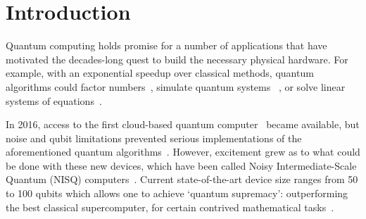 \documentclass[prx,twocolumn,floatfix,superscriptaddress,longbibliography]{revtex4-1}
\newcommand{\<}{\langle}
\renewcommand{\>}{\rangle}
\begin{document}
\begin{abstract}
Applications such as simulating complicated quantum systems or solving large-scale linear algebra problems are very challenging for classical computers due to the extremely high computational cost. Quantum computers promise a solution, although fault-tolerant quantum computers will likely not be available in the near future. Current quantum devices have serious constraints, including limited numbers of qubits  and noise processes that limit circuit depth. Variational Quantum Algorithms (VQAs), which use a classical optimizer to train a parametrized quantum circuit, have emerged as a leading strategy to address these constraints. VQAs have now been proposed for essentially all applications that researchers have envisioned for quantum computers, and they appear to the best hope for obtaining quantum advantage. Nevertheless, challenges remain including the trainability, accuracy, and efficiency of VQAs. Here we overview the field of VQAs, discuss strategies to overcome their challenges, and highlight the exciting prospects for using them to obtain quantum advantage.
\end{abstract}




\maketitle


\section{Introduction}
Quantum computing holds promise for a number of applications that have motivated the decades-long quest to build the necessary physical hardware. For example, with an exponential speedup over classical methods, quantum algorithms could factor numbers~\cite{shor1994algorithms}, simulate quantum systems ~\cite{lloyd1996universal}, or solve linear systems of equations~\cite{harrow2009quantum}. 

In 2016, access to the first cloud-based quantum computer~\cite{IBM} became available, but noise and qubit limitations prevented serious implementations of the aforementioned quantum algorithms~\cite{coles2018quantum}. However, excitement grew as to what could be done with these new devices, which have been called Noisy Intermediate-Scale Quantum (NISQ) computers~\cite{preskill2018quantum}. Current state-of-the-art device size ranges from 50 to 100 qubits which allows one to achieve `quantum supremacy': outperforming the best classical supercomputer, for certain contrived mathematical tasks~\cite{arute2019quantum,zhong2020quantum}. 
\end{document}
